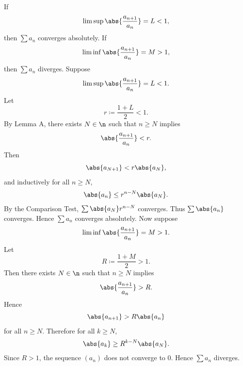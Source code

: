 \begin{theorem}{
    If
    \[
        \limsup \abs{\dfrac{a_{n+1}}{a_n}} = L < 1,
    \]
    then $\sum a_n$ converges absolutely.
    If
    \[
        \liminf \abs{\dfrac{a_{n+1}}{a_n}} = M > 1,
    \]
    then $\sum a_n$ diverges.
}
    Suppose
    \[
        \limsup \abs{\dfrac{a_{n+1}}{a_n}} = L < 1.
    \]
    Let
    \[
        r \coloneqq \dfrac{1 + L}{2} < 1.
    \]
    By Lemma A, there exists $N\in\n$ such that $n\geq N$ implies
    \[
        \abs{\dfrac{a_{n+1}}{a_n}} < r.
    \]
    Then
    \[
        \abs{a_{N+1}} < r\abs{a_N},
    \]
    and inductively for all $n\geq N$,
    \[
        \abs{a_n}\leq r^{n-N}\abs{a_N}.
    \]
    By the Comparison Test, $\sum \abs{a_N}r^{n-N}$ converges.
    Thus $\sum \abs{a_n}$ converges.
    Hence $\sum a_n$ converges absolutely.
    Now suppose
    \[
        \liminf \abs{\dfrac{a_{n+1}}{a_n}} = M > 1.
    \]
    Let
    \[
        R \coloneqq \dfrac{1 + M}{2} > 1.
    \]
    Then there exists $N\in\n$ such that $n\geq N$ implies
    \[
        \abs{\dfrac{a_{n+1}}{a_n}} > R.
    \]
    Hence
    \[
        \abs{a_{n+1}} > R\abs{a_n}
    \]
    for all $n\geq N$.
    Therefore for all $k\geq N$,
    \[
        \abs{a_k} \geq R^{k-N}\abs{a_N}.
    \]
    Since $R>1$, the sequence $(a_n)$ does not converge to $0$.
    Hence $\sum a_n$ diverges.
\end{theorem}